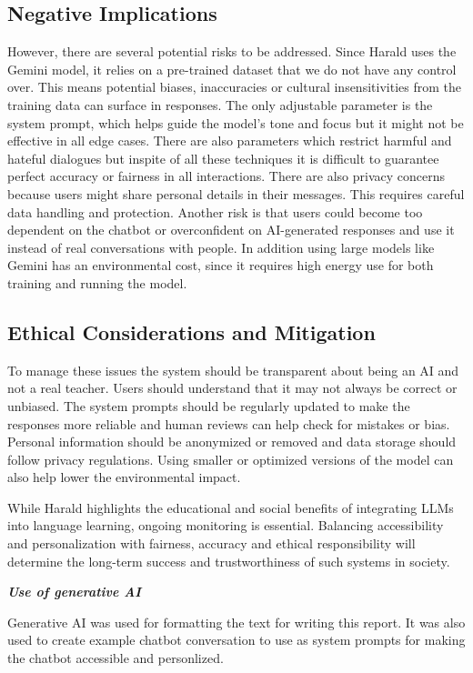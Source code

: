 \documentclass[a4paper,10pt]{article}
\begin{document}
\subsection{Negative Implications}
However, there are several potential risks to be addressed. Since Harald uses the Gemini model, it relies on a pre-trained dataset that we do not have any control over. This means potential biases, inaccuracies or cultural insensitivities from the training data can surface in responses. The only adjustable parameter is the system prompt, which helps guide the model’s tone and focus but it might not be effective in all edge cases. There are also parameters which restrict harmful and hateful dialogues but inspite of all these techniques it is difficult to guarantee perfect accuracy or fairness in all interactions. There are also privacy concerns because users might share personal details in their messages. This requires careful data handling and protection. Another risk is that users could become too dependent on the chatbot or overconfident on AI-generated responses and use it instead of real conversations with people. In addition using large models like Gemini has an environmental cost, since it requires high energy use for both training and running the model.

\subsection{Ethical Considerations and Mitigation}
To manage these issues the system should be transparent about being an AI and not a real teacher. Users should understand that it may not always be correct or unbiased. The system prompts should be regularly updated to make the responses more reliable and human reviews can help check for mistakes or bias. Personal information should be anonymized or removed and data storage should follow privacy regulations. Using smaller or optimized versions of the model can also help lower the environmental impact.

While Harald highlights the educational and social benefits of integrating LLMs into language learning, ongoing monitoring is essential. Balancing accessibility and personalization with fairness, accuracy and ethical responsibility will determine the long-term success and trustworthiness of such systems in society.
	
\hfill \break
\textit{\textbf{Use of generative AI}}

Generative AI was used for formatting the text for writing this report. It was also used to create example chatbot conversation to use as system prompts for making the chatbot accessible and personlized.
\end{document}

